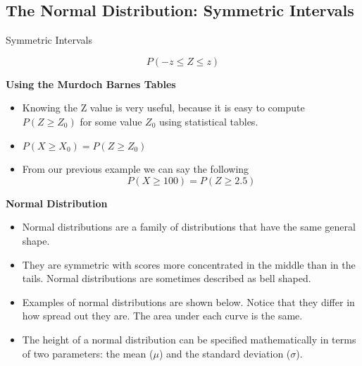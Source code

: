 \documentclass[]{report}
\begin{document}
\subsection{The Normal Distribution: Symmetric Intervals}


Symmetric Intervals

\[ P( -z \leq Z \leq z) \]

	








\newpage

{
	\textbf{Using the Murdoch Barnes Tables}
	
	
	\begin{itemize}
		\item Knowing the Z value is very useful, because it is easy to compute $P(Z \geq Z_0)$ for some value $Z_0$ using statistical tables.
		\bigskip
		\item $P(X \geq X_0) = P(Z \geq Z_0)$\bigskip
		\item From our previous example we can say the following
		\[ P(X \geq 100) = P(Z \geq 2.5)\]
	\end{itemize}
	
}


{
	\textbf{Normal Distribution} 
	\begin{itemize}
		\item Normal distributions are a family of distributions that have the same general shape. 
		\item They are symmetric with scores more concentrated in the middle than in the tails. Normal distributions are sometimes described as bell shaped. 
		\item Examples of normal distributions are shown below. Notice that they differ in how spread out they are. The area under each curve is the same. 
		\item The height of a normal distribution can be specified mathematically in terms of two parameters: the mean ($\mu$) and the standard deviation ($\sigma$). 
		
	\end{itemize}
}






	

		
		

	
	
\end{document}
